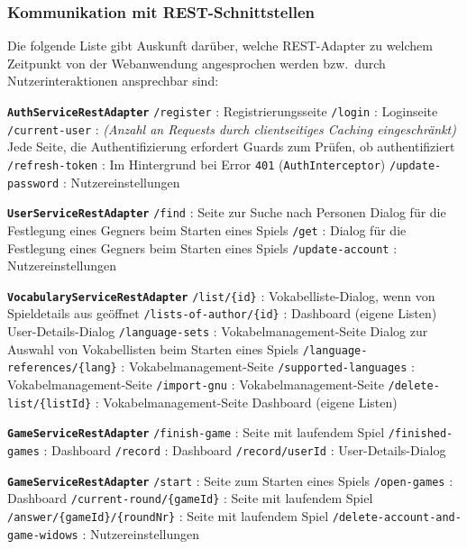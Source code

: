 \subsubsection{Kommunikation mit REST-Schnittstellen}

Die folgende Liste gibt Auskunft darüber, welche REST-Adapter zu welchem Zeitpunkt von der Webanwendung angesprochen werden bzw.\ durch Nutzerinteraktionen ansprechbar sind:

\begin{outline}
    \1 \textbf{\texttt{AuthServiceRestAdapter}}
    \2 \texttt{/register} : Registrierungsseite
    \2 \texttt{/login} : Loginseite
    \2 \texttt{/current-user} : \textit{(Anzahl an Requests durch clientseitiges Caching eingeschränkt)}
    \3 Jede Seite, die Authentifizierung erfordert
    \3 Guards zum Prüfen, ob authentifiziert
    \2 \texttt{/refresh-token} : Im Hintergrund bei Error \texttt{401} (\texttt{AuthInterceptor})
    \2 \texttt{/update-password} : Nutzereinstellungen

    \1 \textbf{\texttt{UserServiceRestAdapter}}
    \2 \texttt{/find} :
    \3 Seite zur Suche nach Personen
    \3 Dialog für die Festlegung eines Gegners beim Starten eines Spiels
    \2 \texttt{/get} : Dialog für die Festlegung eines Gegners beim Starten eines Spiels
    \2 \texttt{/update-account} : Nutzereinstellungen

    \1 \textbf{\texttt{VocabularyServiceRestAdapter}}
    \2 \texttt{/list/\{id\}} : Vokabelliste-Dialog, wenn von Spieldetails aus geöffnet
    \2 \texttt{/lists-of-author/\{id\}} :
    \3 Dashboard (eigene Listen)
    \3 User-Details-Dialog
    \2 \texttt{/language-sets} :
    \3 Vokabelmanagement-Seite
    \3 Dialog zur Auswahl von Vokabellisten beim Starten eines Spiels
    \2 \texttt{/language-references/\{lang\}} : Vokabelmanagement-Seite
    \2 \texttt{/supported-languages} : Vokabelmanagement-Seite
    \2 \texttt{/import-gnu} : Vokabelmanagement-Seite
    \2 \texttt{/delete-list/\{listId\}} :
    \3 Vokabelmanagement-Seite
    \3 Dashboard (eigene Listen)

    \1 \textbf{\texttt{GameServiceRestAdapter}}
    \2 \texttt{/finish-game} : Seite mit laufendem Spiel
    \2 \texttt{/finished-games} : Dashboard
    \2 \texttt{/record} : Dashboard
    \2 \texttt{/record/{userId}} : User-Details-Dialog

    \1 \textbf{\texttt{GameServiceRestAdapter}}
    \2 \texttt{/start} : Seite zum Starten eines Spiels
    \2 \texttt{/open-games} : Dashboard
    \2 \texttt{/current-round/\{gameId\}} : Seite mit laufendem Spiel
    \2 \texttt{/answer/\{gameId\}/\{roundNr\}} : Seite mit laufendem Spiel
    \2 \texttt{/delete-account-and-game-widows} : Nutzereinstellungen

\end{outline}

